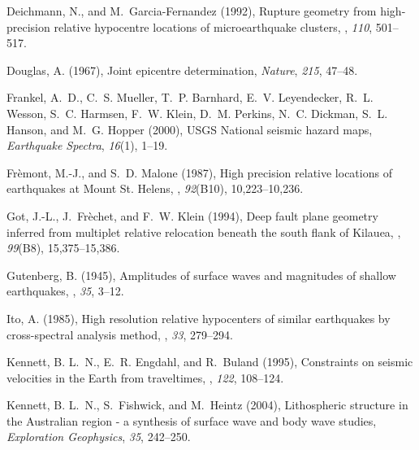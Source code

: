 \documentclass[12pt,double]{article}
\providecommand{\DIFaddend}{} %
\begin{document}
\begin{thebibliography}{45}
\DIFaddend {}
Deichmann, N., and M.~Garcia-{F}ernandez (1992), Rupture geometry from
  high-precision relative hypocentre locations of microearthquake clusters,
  \gji, \textit{110}, 501--517.

Douglas, A. (1967), Joint epicentre determination, \textit{Nature},
  \textit{215}, 47--48.

Frankel, A.~D., C.~S. Mueller, T.~P. Barnhard, E.~V. Leyendecker, R.~L. Wesson,
  S.~C. Harmsen, F.~W. Klein, D.~M. Perkins, N.~C. Dickman, S.~L. Hanson, and
  M.~G. Hopper (2000), {USGS} {N}ational seismic hazard maps,
  \textit{Earthquake Spectra}, \textit{16}(1), 1--19.

Fr\`emont, M.-J., and S.~D. Malone (1987), High precision relative locations of
  earthquakes at {M}ount {St.} {H}elens, \jgr, \textit{92}(B10), 10,223--10,236.

Got, J.-L., J.~Fr\`echet, and F.~W. Klein (1994), Deep fault plane geometry
  inferred from multiplet relative relocation beneath the south flank of
  {K}ilauea, \jgr, \textit{99}(B8),
  15,375--15,386.

Gutenberg, B. (1945), Amplitudes of surface waves and magnitudes of shallow
  earthquakes, \bssa,
  \textit{35}, 3--12.

Ito, A. (1985), High resolution relative hypocenters of similar earthquakes by
  cross-spectral analysis method, \jpe,
  \textit{33}, 279--294.

Kennett, B. L.~N., E.~R. Engdahl, and R.~Buland (1995), Constraints on seismic
  velocities in the {E}arth from traveltimes, \gji, \textit{122}, 108--124.

Kennett, B. L.~N., S.~Fishwick, and M.~Heintz (2004), Lithospheric structure in
  the {A}ustralian region - a synthesis of surface wave and body wave studies,
  \textit{Exploration Geophysics}, \textit{35}, 242--250.


\end{thebibliography}
\end{document}
